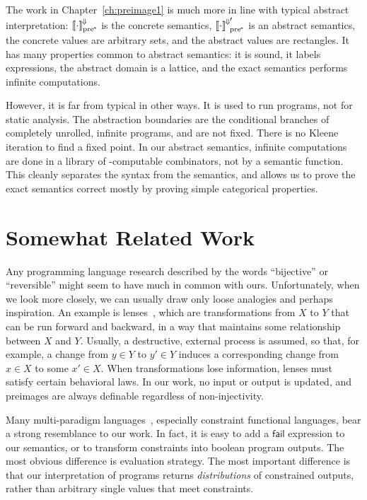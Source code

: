 The work in Chapter~\ref{ch:preimage1} is much more in line with typical abstract interpretation: $\left\llbracket{\cdot}\right\rrbracket^{\mspace{-2mu}\Downarrow\mspace{-2mu}}_\mathrm{pre^{\mspace{-2mu}*}}$ is the concrete semantics, ${\left\llbracket{\cdot}\right\rrbracket^{\mspace{-2mu}\Downarrow\mspace{-2mu}}}_\mathrm{pre^{\mspace{-2mu}*}}'$ is an abstract semantics, the concrete values are arbitrary sets, and the abstract values are rectangles.
It has many properties common to abstract semantics: it is sound, it labels expressions, the abstract domain is a lattice, and the exact semantics performs infinite computations.

However, it is far from typical in other ways.
It is used to run programs, not for static analysis.
The abstraction boundaries are the conditional branches of completely unrolled, infinite programs, and are not fixed.
There is no Kleene iteration to find a fixed point.
In our abstract semantics, infinite computations are done in a library of \lzfclang-computable combinators, not by a semantic function.
This cleanly separates the syntax from the semantics, and allows us to prove the exact semantics correct mostly by proving simple categorical properties.



\section{Somewhat Related Work}

Any programming language research described by the words ``bijective'' or ``reversible'' might seem to have much in common with ours.
Unfortunately, when we look more closely, we can usually draw only loose analogies and perhaps inspiration.
An example is lenses~\cite{cit:hofmann-2012popl-edit-lenses}, which are transformations from $X$ to $Y$ that can be run forward and backward, in a way that maintains some relationship between $X$ and $Y$.
Usually, a destructive, external process is assumed, so that, for example, a change from $y \in Y$ to $y' \in Y$ induces a corresponding change from $x \in X$ to some $x' \in X$.
When transformations lose information, lenses must satisfy certain behavioral laws.
In our work, no input or output is updated, and preimages are always definable regardless of non-injectivity.

Many multi-paradigm languages~\cite{cit:hanus-2007lp-multi-paradigm}, especially constraint functional languages, bear a strong resemblance to our work.
In fact, it is easy to add a $\mathsf{fail}$ expression to our semantics, or to transform constraints into boolean program outputs.
The most obvious difference is evaluation strategy.
The most important difference is that our interpretation of programs returns \emph{distributions} of constrained outputs, rather than arbitrary single values that meet constraints.
